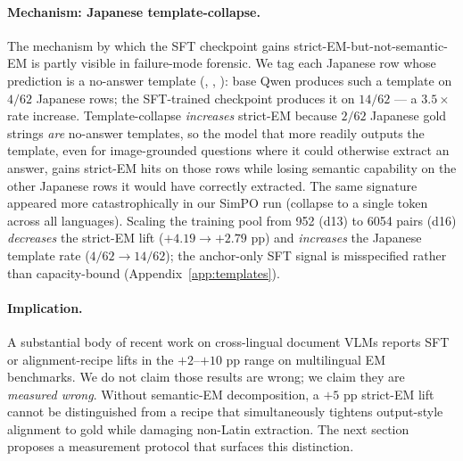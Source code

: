 \paragraph{Mechanism: Japanese template-collapse.}
The mechanism by which the SFT checkpoint gains strict-EM-but-not-semantic-EM is partly visible in failure-mode forensic. We tag each Japanese row whose prediction is a no-answer template (\jatemplate, \jatemplatealt, \jaunknown): base Qwen produces such a template on $4/62$ Japanese rows; the SFT-trained checkpoint produces it on $14/62$ --- a $3.5\times$ rate increase. Template-collapse \emph{increases} strict-EM because $2/62$ Japanese gold strings \emph{are} no-answer templates, so the model that more readily outputs the template, even for image-grounded questions where it could otherwise extract an answer, gains strict-EM hits on those rows while losing semantic capability on the other Japanese rows it would have correctly extracted. The same signature appeared more catastrophically in our SimPO run (collapse to a single \artemplate{} token across all languages). Scaling the training pool from 952 (d13) to 6054 pairs (d16) \emph{decreases} the strict-EM lift ($+4.19 \to +2.79$ pp) and \emph{increases} the Japanese template rate ($4/62 \to 14/62$); the anchor-only SFT signal is misspecified rather than capacity-bound (Appendix~\ref{app:templates}).

\paragraph{Implication.}
A substantial body of recent work on cross-lingual document VLMs reports SFT or alignment-recipe lifts in the $+2$--$+10$ pp range on multilingual EM benchmarks. We do not claim those results are wrong; we claim they are \emph{measured wrong}. Without semantic-EM decomposition, a $+5$ pp strict-EM lift cannot be distinguished from a recipe that simultaneously tightens output-style alignment to gold while damaging non-Latin extraction. The next section proposes a measurement protocol that surfaces this distinction.
